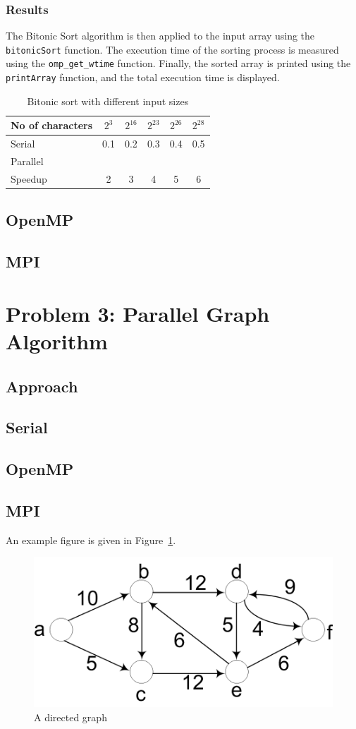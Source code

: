 \subsubsection{Results}
The Bitonic Sort algorithm is then applied to the input array using the \texttt{bitonicSort} function. The execution time of the sorting process is measured using the \texttt{omp\_get\_wtime} function. Finally, the sorted array is printed using the \texttt{printArray} function, and the total execution time is displayed.
\begin{table}[htb]
	\centering
	\caption{Bitonic sort with different input sizes}\label{tab:example}
	\begin{tabular}{l|ccccc}
		\toprule
		No of characters & $2^3$ & $2^{16}$ & $2^{23}$ & $2^{26}$ & $2^{28}$\\
		\midrule
		Serial &0.1&0.2&0.3&0.4&0.5\\
		Parallel &&&&\\
		Speedup &2&3&4&5&6\\
		\bottomrule
	\end{tabular}
\end{table} 
\subsection{OpenMP} 
\subsection{MPI}
\pagebreak
\section{Problem 3: Parallel Graph Algorithm}
\subsection*{Approach}
\subsection{Serial}
\subsection{OpenMP}
\subsection{MPI}
An example figure is given in Figure~\ref{fig:sp_fig1}.
\begin{figure}[htb]
	\centering
	\includegraphics[width=0.5\linewidth]{pics/sp_fig1.png}
	\caption{A directed graph}\label{fig:sp_fig1}
\end{figure}

